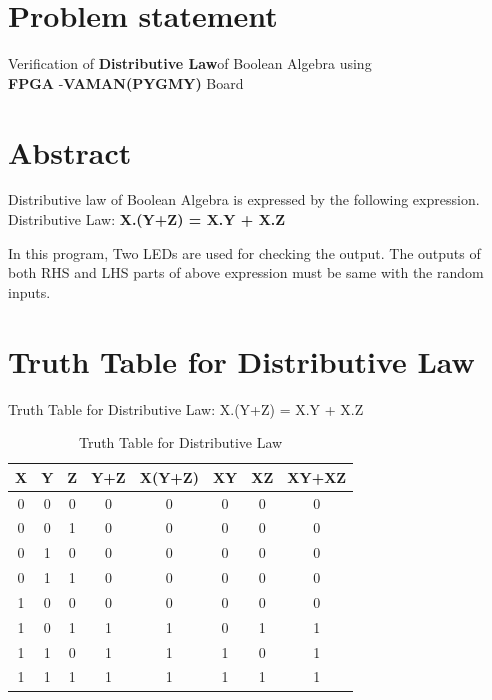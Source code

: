 \documentclass[journal,10pt,twocolumn]{article}
\begin{document}
\section{Problem statement}
\begin{flushleft}
Verification of \textbf{Distributive Law}of Boolean Algebra using\\
\vspace{0.25cm}
\textbf{FPGA} -\textbf{VAMAN(PYGMY)} Board\\
\end{flushleft}
\section{Abstract}
\begin{flushleft}
Distributive law of Boolean Algebra is expressed by the following expression.\\
\vspace{0.25cm}
Distributive Law: \textbf{X.(Y+Z) = X.Y + X.Z} \\
\vspace{0.25cm}

In this program, Two LEDs are used for checking the output. The outputs of both RHS and LHS parts of above expression must be same with the random inputs.\\
\end{flushleft}

\section{Truth Table for Distributive Law}
Truth Table for Distributive Law: X.(Y+Z) = X.Y + X.Z 

\begin{table}[htbp]
    \centering
\begin{tabular}{ | c | c | c | c | c | c | c | c | } \hline
\textbf{X} & \textbf{Y} & \textbf{Z} & Y+Z & \textbf{X(Y+Z)} & XY & XZ & \textbf{XY+XZ} \\\hline
0 & 0 & 0 & 0 & 0 & 0 & 0 & 0 \\
0 & 0 & 1 & 0 & 0 & 0 & 0 & 0 \\
0 & 1 & 0 & 0 & 0 & 0 & 0 & 0 \\
0 & 1 & 1 & 0 & 0 & 0 & 0 & 0 \\
1 & 0 & 0 & 0 & 0 & 0 & 0 & 0 \\
1 & 0 & 1 & 1 & 1 & 0 & 1 & 1 \\
1 & 1 & 0 & 1 & 1 & 1 & 0 & 1 \\
1 & 1 & 1 & 1 & 1 & 1 & 1 & 1 \\ \hline
\end{tabular}
\caption{\label{tab:widgets}Truth Table for Distributive Law}
\end{table}
\end{document}
